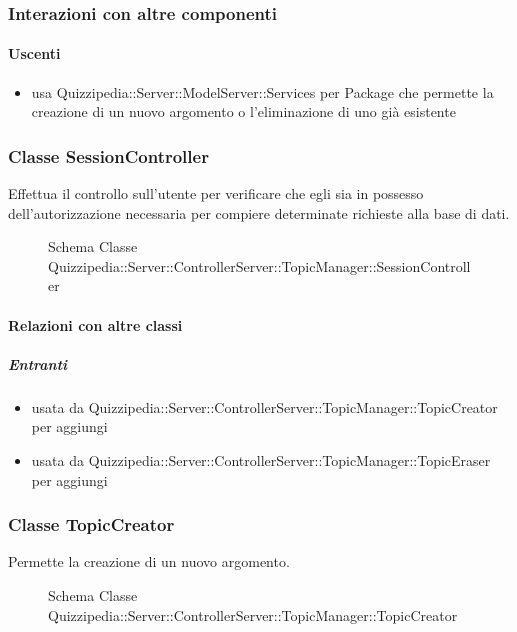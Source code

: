 \subsubsection{Interazioni con altre componenti}
\paragraph{Uscenti}
\begin{itemize}
\item usa Quizzipedia::Server::ModelServer::Services per Package che permette la creazione di un nuovo argomento o l'eliminazione di uno già esistente
\end{itemize}
\subsubsection{Classe SessionController}
Effettua il controllo sull'utente per verificare che egli sia in possesso dell'autorizzazione necessaria per compiere determinate richieste alla base di dati.
\begin{figure}[H]
\centering
\noindent{}
\caption[Schema Classe SessionController]{Schema Classe Quizzipedia::Server::ControllerServer::TopicManager::SessionController}
\end{figure}
\paragraph{Relazioni con altre classi}
\subparagraph{Entranti}
\begin{itemize}
\item usata da Quizzipedia::Server::ControllerServer::TopicManager::TopicCreator per aggiungi
\item usata da Quizzipedia::Server::ControllerServer::TopicManager::TopicEraser per aggiungi
\end{itemize}
\subsubsection{Classe TopicCreator}
Permette la creazione di un nuovo argomento.
\begin{figure}[H]
\centering
\noindent{}
\caption[Schema Classe TopicCreator]{Schema Classe Quizzipedia::Server::ControllerServer::TopicManager::TopicCreator}
\end{figure}
